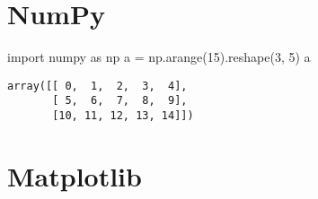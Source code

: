 \documentclass[
  letterpaper,
  DIV=11,
  numbers=noendperiod]{scrreprt}
\newenvironment{Shaded}{\begin{snugshade}}{\end{snugshade}}
\newcommand{\DecValTok}[1]{\textcolor[rgb]{0.68,0.00,0.00}{#1}}
\newcommand{\ImportTok}[1]{\textcolor[rgb]{0.00,0.48,0.65}{#1}}
\newcommand{\NormalTok}[1]{\textcolor[rgb]{0.00,0.48,0.65}{#1}}
\newcommand{\OperatorTok}[1]{\textcolor[rgb]{0.37,0.37,0.37}{#1}}
\begin{document}
\hypertarget{numpy}{%
\section{NumPy}\label{numpy}}

\begin{Shaded}
\begin{Highlighting}[]
\ImportTok{import}\NormalTok{ numpy }\ImportTok{as}\NormalTok{ np}
\NormalTok{a }\OperatorTok{=}\NormalTok{ np.arange(}\DecValTok{15}\NormalTok{).reshape(}\DecValTok{3}\NormalTok{, }\DecValTok{5}\NormalTok{)}
\NormalTok{a}
\end{Highlighting}
\end{Shaded}

\begin{verbatim}
array([[ 0,  1,  2,  3,  4],
       [ 5,  6,  7,  8,  9],
       [10, 11, 12, 13, 14]])
\end{verbatim}

\hypertarget{matplotlib}{%
\section{Matplotlib}\label{matplotlib}}
\end{document}

